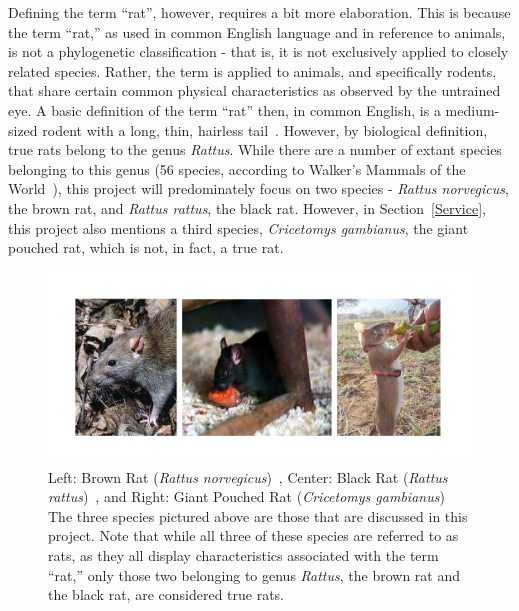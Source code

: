 \documentclass[12pt]{article}
\begin{document}
Defining the term ``rat'', however, requires a bit more elaboration. This is because the term ``rat,'' as used in common English language and in reference to animals, is not a phylogenetic classification - that is, it is not exclusively applied to closely related species. Rather, the term is applied to animals, and specifically rodents, that share certain common physical characteristics as observed by the untrained eye. A basic definition of the term ``rat'' then, in common English, is a medium-sized rodent with a long, thin, hairless tail~\cite{Hanson2012}. However, by biological definition, true rats belong to the genus \textit{Rattus}. While there are a number of extant species belonging to this genus (56 species, according to Walker's Mammals of the World~\cite{WalkerRattus1999}), this project will predominately focus on two species - \textit{Rattus norvegicus}, the brown rat, and \textit{Rattus rattus}, the black rat. However, in Section~\ref{Service}, this project also mentions a third species, \textit{Cricetomys gambianus}, the giant pouched rat, which is not, in fact, a true rat.
\begin{figure}
\centering
\includegraphics[width=6in,trim={0 .4in 0 .4in},clip]{RatVariations}
\caption{Left: Brown Rat (\textit{Rattus norvegicus})~\cite{BrownRatWikipedia2014}, Center: Black Rat (\textit{Rattus rattus})~\cite{BlackRatWikipedia2014}, and Right: Giant Pouched Rat (\textit{Cricetomys gambianus})~\cite{GiantPouchedRatWikipedia2014}\\
The three species pictured above are those that are discussed in this project. Note that while all three of these species are referred to as rats, as they all display characteristics associated with the term ``rat,'' only those two belonging to genus \textit{Rattus}, the brown rat and the black rat, are considered true rats.}
\label{RatVariationsFigure}
\end{figure}
\end{document}
